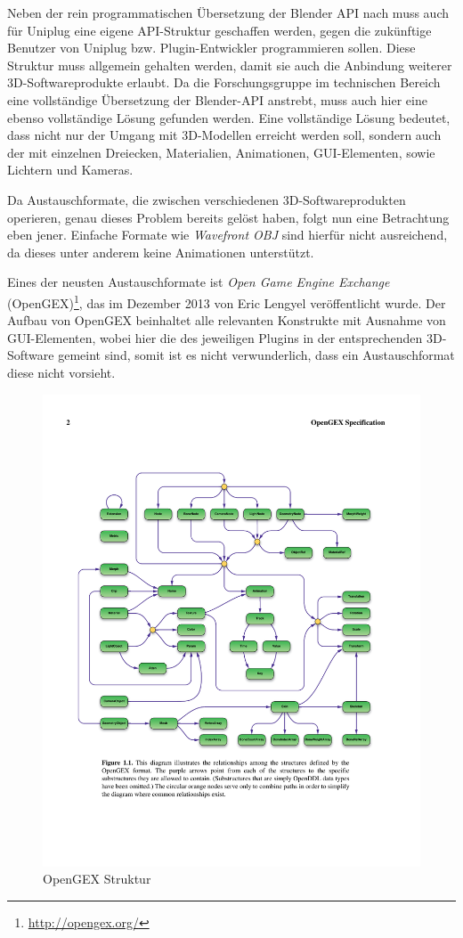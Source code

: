  \label{sec:logi}

Neben der rein programmatischen Übersetzung der Blender API nach \CS muss auch für Uniplug eine eigene API-Struktur geschaffen werden, gegen die zukünftige Benutzer von Uniplug bzw. Plugin-Entwickler programmieren sollen. Diese Struktur muss allgemein gehalten werden, damit sie auch die Anbindung weiterer 3D-Softwareprodukte erlaubt. Da die Forschungsgruppe im technischen Bereich eine vollständige Übersetzung der Blender-API anstrebt, muss auch hier eine ebenso vollständige Lösung gefunden werden. Eine vollständige Lösung bedeutet, dass nicht nur der Umgang mit 3D-Modellen erreicht werden soll, sondern auch der mit einzelnen Dreiecken, Materialien, Animationen, GUI-Elementen, sowie Lichtern und Kameras.

Da Austauschformate, die zwischen verschiedenen 3D-Softwareprodukten operieren, genau dieses Problem bereits gelöst haben, folgt nun eine Betrachtung eben jener. Einfache Formate wie \emph{Wavefront OBJ} sind hierfür nicht ausreichend, da dieses unter anderem keine Animationen unterstützt.

Eines der neusten Austauschformate ist \emph{Open Game Engine Exchange} (OpenGEX)\footnote{\url{http://opengex.org/}}, das im Dezember 2013 von Eric Lengyel veröffentlicht wurde. Der Aufbau von OpenGEX beinhaltet alle relevanten Konstrukte mit Ausnahme von GUI-Elementen, wobei hier die des jeweiligen Plugins in der entsprechenden 3D-Software gemeint sind, somit ist es nicht verwunderlich, dass ein Austauschformat diese nicht vorsieht.

\begin{figure}[htbp]
\center
\includegraphics[width=1\textwidth]{images/opengexstruktur}
\caption{OpenGEX Struktur}
\label{fig:opengexstruktur}
\end{figure}